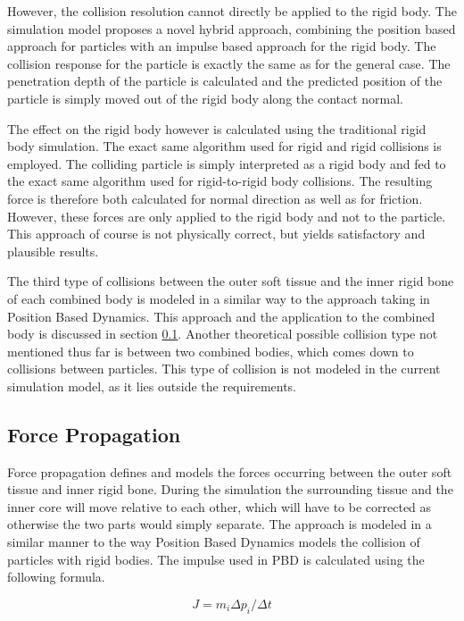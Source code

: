 However, the collision resolution cannot directly be applied to the rigid body. The simulation model proposes a novel hybrid approach, combining the position based approach for particles with an impulse based approach for the rigid body. The collision response for the particle is exactly the same as for the general case. The penetration depth of the particle is calculated and the predicted position of the particle is simply moved out of the rigid body along the contact normal.

The effect on the rigid body however is calculated using the traditional rigid body simulation. The exact same algorithm used for rigid and rigid collisions is employed. The colliding particle is simply interpreted as a rigid body and fed to the exact same algorithm used for rigid-to-rigid body collisions. The resulting force is therefore both calculated for normal direction as well as for friction. However, these forces are only applied to the rigid body and not to the particle. This approach of course is not physically correct, but yields satisfactory and plausible results.

The third type of collisions between the outer soft tissue and the inner rigid bone of each combined body is modeled in a similar way to the approach taking in Position Based Dynamics. This approach and the application to the combined body is discussed in section \ref{subsec:force_propagation}. Another theoretical possible collision type not mentioned thus far is between two combined bodies, which comes down to collisions between particles. This type of collision is not modeled in the current simulation model, as it lies outside the requirements.

\subsection{Force Propagation}
\label{subsec:force_propagation}

Force propagation defines and models the forces occurring between the outer soft tissue and inner rigid bone. During the simulation the surrounding tissue and the inner core will move relative to each other, which will have to be corrected as otherwise the two parts would simply separate. The approach is modeled in a similar manner to the way Position Based Dynamics models the collision of particles with rigid bodies. The impulse used in PBD is calculated using the following formula.

\begin{equation}
J = m_i \Delta p_i/\Delta t
\end{equation}

